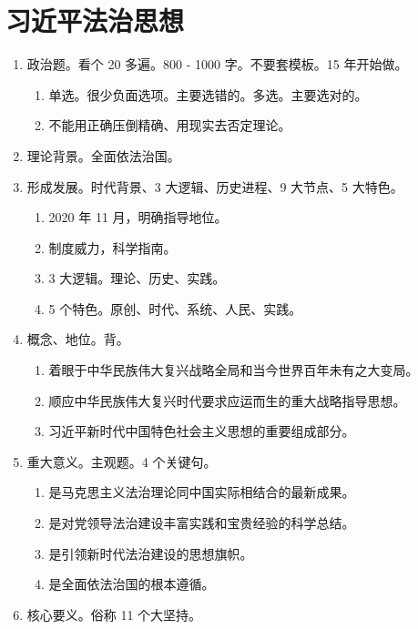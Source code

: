 \section{习近平法治思想}
\begin{enumerate}
  \item 政治题。看个 20 多遍。800 - 1000 字。不要套模板。15 年开始做。
        \begin{enumerate}
          \item 单选。很少负面选项。主要选错的。多选。主要选对的。
          \item 不能用正确压倒精确、用现实去否定理论。
        \end{enumerate}
  \item 理论背景。全面依法治国。
  \item 形成发展。时代背景、3 大逻辑、历史进程、9 大节点、5 大特色。
        \begin{enumerate}
          \item 2020 年 11 月，明确指导地位。
          \item 制度威力，科学指南。
          \item 3 大逻辑。理论、历史、实践。
          \item 5 个特色。原创、时代、系统、人民、实践。
        \end{enumerate}
  \item 概念、地位。背。
        \begin{enumerate}
          \item 着眼于中华民族伟大复兴战略全局和当今世界百年未有之大变局。
          \item 顺应中华民族伟大复兴时代要求应运而生的重大战略指导思想。
          \item 习近平新时代中国特色社会主义思想的重要组成部分。
        \end{enumerate}
  \item 重大意义。主观题。4 个关键句。
        \begin{enumerate}
          \item 是马克思主义法治理论同中国实际相结合的最新成果。
          \item 是对党领导法治建设丰富实践和宝贵经验的科学总结。
          \item 是引领新时代法治建设的思想旗帜。
          \item 是全面依法治国的根本遵循。
        \end{enumerate}
  \item 核心要义。俗称 11 个大坚持。
        \begin{enumerate}

\end{enumerate}
\end{enumerate}
